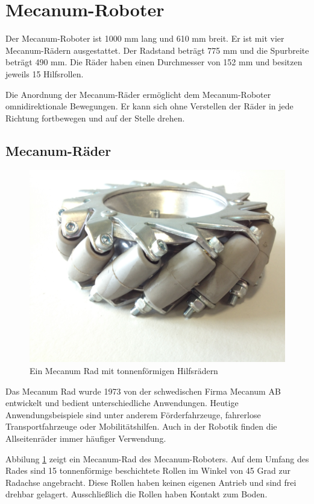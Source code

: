 \section{Mecanum-Roboter}
\label{sec:Mecanum-Roboter}

Der Mecanum-Roboter ist 1000 mm lang und 610 mm breit. Er ist mit vier Mecanum-Rädern ausgestattet. Der Radstand beträgt 775 mm und die Spurbreite beträgt 490 mm. Die Räder haben einen Durchmesser von 152 mm und besitzen jeweils 15 Hilfsrollen.

Die Anordnung der Mecanum-Räder ermöglicht dem Mecanum-Roboter omnidirektionale Bewegungen.
Er kann sich ohne Verstellen der Räder in jede Richtung fortbewegen und auf der Stelle drehen.

\subsection*{Mecanum-Räder}
\label{sec:Mecanum-Raeder}
\begin{figure}
\centering
 \includegraphics[width=.6\textwidth]{Abbildungen/Mecanumrad} 
\caption[Mecanum-Rad]{Ein Mecanum Rad mit tonnenförmigen Hilfsrädern}
\label{fig:Mecanum-Rad}
\end{figure}
Das Mecanum Rad wurde 1973 von der schwedischen Firma Mecanum AB entwickelt und bedient unterschiedliche Anwendungen. Heutige Anwendungsbeispiele sind unter anderem Förderfahrzeuge, fahrerlose Transportfahrzeuge oder Mobilitätshilfen. Auch in der Robotik finden die Allseitenräder immer häufiger Verwendung.

Abbilung \ref{fig:Mecanum-Rad} zeigt ein Mecanum-Rad des Mecanum-Roboters. Auf dem Umfang des Rades sind 15 tonnenförmige beschichtete Rollen im Winkel von 45 Grad zur Radachse angebracht. Diese Rollen haben keinen eigenen Antrieb und sind frei drehbar gelagert. Ausschließlich die Rollen haben Kontakt zum Boden.

